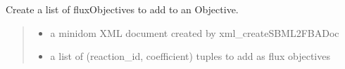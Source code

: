 \documentclass[letterpaper,12pt,english]{sphinxmanual}
\begin{document}
\begin{fulllineitems}
\label{\detokenize{api/io:cbmpy.CBXML.xml_createListOfFluxObjectives}}
\pysigstartsignatures
\pysiglinewithargsret
{}
{\sphinxparamcomma {}}
{}
\pysigstopsignatures
\sphinxAtStartPar
Create a list of fluxObjectives to add to an Objective.
\begin{quote}\begin{description}
\begin{itemize}
\item {} 
\sphinxAtStartPar
{} \textendash{} a minidom XML document created by xml\_createSBML2FBADoc

\item {} 
\sphinxAtStartPar
{} \textendash{} a list of (reaction\_id, coefficient) tuples to add as flux objectives

\end{itemize}

\sphinxAtStartPar
{}

\end{description}\end{quote}

\end{fulllineitems}

\end{document}

